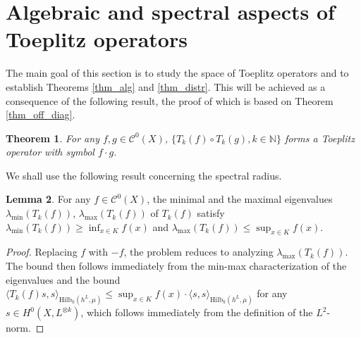 \documentclass[12pt]{article}
\numberwithin{equation}{section}
\theoremstyle{theorem}
\newtheorem{thm}{Theorem}[section]
\theoremstyle{definition}
\newtheorem{lem}[thm]{Lemma}
\theoremstyle{remark}
\newcommand{\nat}{\mathbb{N}}
\newcommand{\ccal}{\mathscr{C}}
\begin{document}
	\section{Algebraic and spectral aspects of Toeplitz operators}\label{sect_toepl}
	The main goal of this section is to study the space of Toeplitz operators and to establish Theorems \ref{thm_alg} and \ref{thm_distr}.
	This will be achieved as a consequence of the following result, the proof of which is based on Theorem \ref{thm_off_diag}.
	\begin{thm}\label{thm_prod_thm}
		For any $f, g \in \ccal^0(X)$, $\{ T_k(f) \circ T_k(g), k \in \nat \}$ forms a Toeplitz operator with symbol $f \cdot g$.
	\end{thm}
	We shall use the following result concerning the spectral radius.
	\begin{sloppypar}
	\begin{lem}\label{lem_spec_radius}
		For any $f \in \ccal^0(X)$, the minimal and the maximal eigenvalues $\lambda_{\min}(T_k(f))$, $\lambda_{\max}(T_k(f))$ of $T_k(f)$ satisfy $\lambda_{\min}(T_k(f)) \geq \inf_{x \in K} f(x)$ and $\lambda_{\max}(T_k(f)) \leq \sup_{x \in K} f(x)$.
	\end{lem}
	\begin{proof}
		Replacing $f$ with $-f$, the problem reduces to analyzing $\lambda_{\max}(T_k(f))$.
		The bound then follows immediately from the min-max characterization of the eigenvalues and the bound $\langle T_k(f) s, s \rangle_{{\textrm{Hilb}}_k(h^L, \mu)} \leq \sup_{x \in K} f(x) \cdot \langle s, s \rangle_{{\textrm{Hilb}}_k(h^L, \mu)}$ for any $s \in H^0(X, L^{\otimes k})$, which follows immediately from the definition of the $L^2$-norm.
	\end{proof}
	\end{sloppypar}
\end{document}
